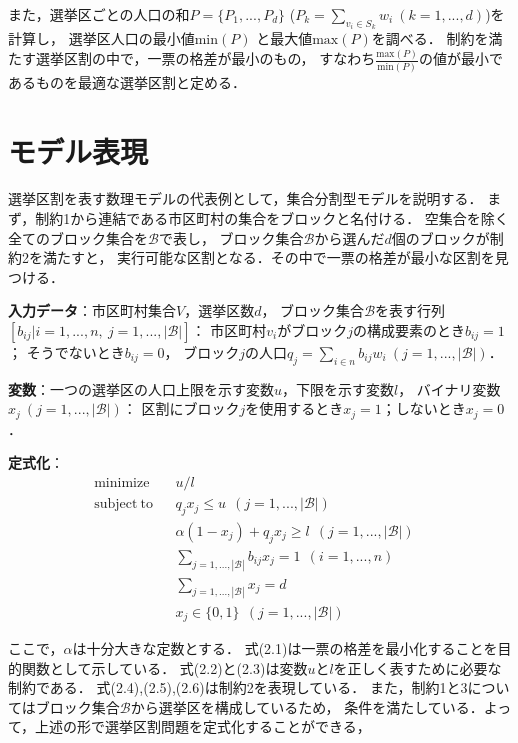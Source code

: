 また，選挙区ごとの人口の和$P=\{P_1,...,P_d\}$ ($P_k=\sum_{v_i\in S_k}w_i\ (k=1,...,d)$)を計算し，
選挙区人口の最小値$\mathrm{min}(P)$ と最大値$\mathrm{max}(P)$を調べる．
制約を満たす選挙区割の中で，一票の格差が最小のもの，
すなわち$\frac{\mathrm{max}(P)}{\mathrm{min}(P)}$の値が最小であるものを最適な選挙区割と定める．


\section{モデル表現}
選挙区割を表す数理モデルの代表例として，集合分割型モデル\cite{nemoto}を説明する．
まず，制約1から連結である市区町村の集合をブロックと名付ける．
空集合を除く全てのブロック集合を$\mathscr{B}$で表し，
ブロック集合$\mathscr{B}$から選んだ$d$個のブロックが制約2を満たすと，
実行可能な区割となる．その中で一票の格差が最小な区割を見つける．

\textbf{入力データ}：市区町村集合$V$，選挙区数$d$，
ブロック集合$\mathscr{B}$を表す行列$[b_{ij}|i=1,...,n,~j=1,...,|\mathscr{B}|]$：
市区町村$v_i$がブロック$j$の構成要素のとき$b_{ij}=1$；
そうでないとき$b_{ij}=0$，
ブロック$j$の人口$q_j=\sum_{i\in n}b_{ij}w_{i}~(j=1,...,|\mathscr{B}|)$．

\textbf{変数}：一つの選挙区の人口上限を示す変数$u$，下限を示す変数$l$，
バイナリ変数$x_j~(j=1,...,|\mathscr{B}|)$：
区割にブロック$j$を使用するとき$x_j=1$；しないとき$x_j=0$．

\textbf{定式化}：
\begin{align}
    &\mathrm{minimize} && u/l && \\
    &\mathrm{subject~to} && q_jx_j\leq u~~(j=1,...,|\mathscr{B}|) && \\
    & && \alpha(1-x_j)+q_jx_j\geq l~~(j=1,...,|\mathscr{B}|) && \\
    & && \sum_{j=1,...,|\mathscr{B}|}b_{ij}x_{j}=1~~(i = 1, ... , n) && \\
    & && \sum_{j=1,...,|\mathscr{B}|}x_j=d && \\
    & && x_j \in \{0,1\}~~(j=1,...,|\mathscr{B}|) &&
\end{align}

ここで，$\alpha$は十分大きな定数とする．
式(2.1)は一票の格差を最小化することを目的関数として示している．
式(2.2)と(2.3)は変数$u$と$l$を正しく表すために必要な制約である．
式(2.4),(2.5),(2.6)は制約2を表現している．
また，制約1と3についてはブロック集合$\mathscr{B}$から選挙区を構成しているため，
条件を満たしている．よって，上述の形で選挙区割問題を定式化することができる，